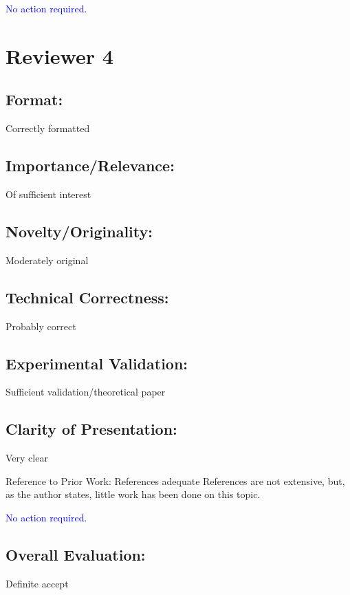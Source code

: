 \documentclass[11pt]{amsart}
\begin{document}
\textcolor{blue}{
No action required.}

\section{Reviewer 4}
\subsection{Format:} Correctly formatted

\subsection{Importance/Relevance:}
 Of sufficient interest

\subsection{Novelty/Originality:}
 Moderately original

\subsection{Technical Correctness: }
Probably correct

\subsection{Experimental Validation:}
 Sufficient validation/theoretical paper

\subsection{Clarity of Presentation:}
 Very clear

Reference to Prior Work: References adequate References are not extensive, but, as the author states, little work has been done on this topic.

\textcolor{blue}{
No action required.}

\subsection{Overall Evaluation:}
 Definite accept
\end{document}
